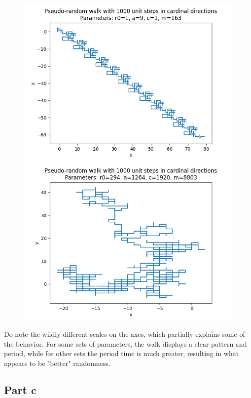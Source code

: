 \documentclass[a4paper,12pt]{article}
\begin{document}
\begin{figure}[!ht]
\begin{minipage}{0.48\textwidth}
    \includegraphics[width=\textwidth]{img/2_1b_free_links.png}
  \end{minipage}
  \begin{minipage}{0.48\textwidth}
    \includegraphics[width=\textwidth]{img/2_1b_free_big2.png}
  \end{minipage}
\end{figure}

Do note the wildly different scales on the axes, which partially explains some of the behavior. For some sets of
parameters, the walk displays a clear pattern and period, while for other sets the period time is much greater,
resulting in what appears to be "better" randomness.

\subsection*{Part c}
\end{document}
